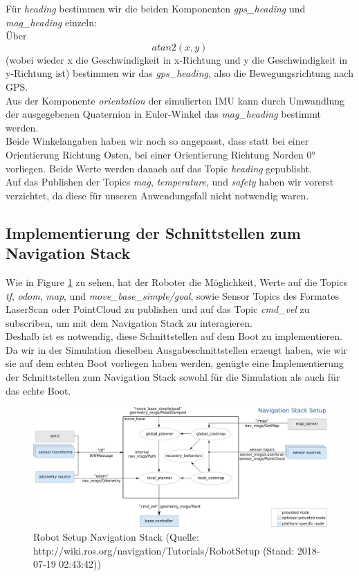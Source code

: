 \documentclass[conference]{IEEEtran}
\begin{document}
Für \textit{heading} bestimmen wir die beiden Komponenten \textit{gps\_heading} und \textit{mag\_heading} einzeln:\\
Über 
\begin{equation}
	atan2(x,y) 	
\end{equation}
(wobei wieder x die Geschwindigkeit in x-Richtung und y die Geschwindigkeit in y-Richtung ist) bestimmen wir das \textit{gps\_heading}, also die Bewegungsrichtung nach GPS. \\
Aus der Komponente \textit{orientation} der simulierten IMU kann durch Umwandlung der ausgegebenen Quaternion in Euler-Winkel das \textit{mag\_heading} bestimmt werden.\\
Beide Winkelangaben haben wir noch so angepasst, dass statt bei einer Orientierung Richtung Osten, bei einer Orientierung Richtung Norden 0° vorliegen. Beide Werte werden danach auf das Topic \textit{heading} gepublisht.\\
Auf das Publishen der Topics \textit{mag}, \textit{temperature}, und \textit{safety} haben wir vorerst verzichtet, da diese für unseren Anwendungsfall nicht notwendig waren.

\subsection{Implementierung der Schnittstellen zum Navigation Stack}
Wie in Figure \ref{nav} zu sehen, hat der Roboter die Möglichkeit, Werte auf die Topics \textit{tf}, \textit{odom}, \textit{map}, und \textit{move\_base\_simple/goal}, sowie Sensor Topics des Formates LaserScan oder PointCloud zu publishen und auf das Topic \textit{cmd\_vel} zu subscriben, um mit dem Navigation Stack zu interagieren.\\
Deshalb ist es notwendig, diese Schnittstellen auf dem Boot zu implementieren. Da wir in der Simulation dieselben Ausgabeschnittstellen erzeugt haben, wie wir sie auf dem echten Boot vorliegen haben werden, genügte eine Implementierung der Schnittstellen zum Navigation Stack sowohl für die Simulation als auch für das echte Boot.
\begin{figure}
	\includegraphics[width=\linewidth]{overview_tf.png}
	\caption{Robot Setup Navigation Stack (Quelle: http://wiki.ros.org/navigation/Tutorials/RobotSetup (Stand: 2018-07-19 02:43:42))}
	\label{nav}
\end{figure}
\end{document}
